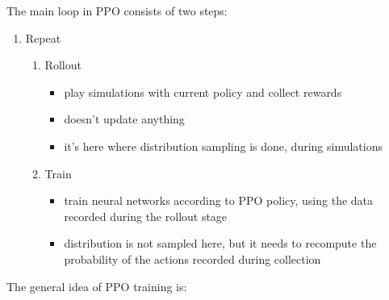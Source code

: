 \documentclass[
  letterpaper,
  DIV=11,
  numbers=noendperiod]{scrartcl}
\providecommand{\tightlist}{%
  \setlength{\itemsep}{0pt}\setlength{\parskip}{0pt}}\usepackage{longtable,booktabs,array}
\begin{document}
The main loop in PPO consists of two steps:

\begin{enumerate}
\def\labelenumi{\arabic{enumi}.}
\tightlist
\item
  Repeat

  \begin{enumerate}
  \def\labelenumii{\arabic{enumii}.}
  \tightlist
  \item
    Rollout

    \begin{itemize}
    \tightlist
    \item
      play simulations with current policy and collect rewards
    \item
      doesn't update anything
    \item
      it's here where distribution sampling is done, during simulations
    \end{itemize}
  \item
    Train

    \begin{itemize}
    \tightlist
    \item
      train neural networks according to PPO policy, using the data
      recorded during the rollout stage
    \item
      distribution is not sampled here, but it needs to recompute the
      probability of the actions recorded during collection
    \end{itemize}
  \end{enumerate}
\end{enumerate}

The general idea of PPO training is:
\end{document}
